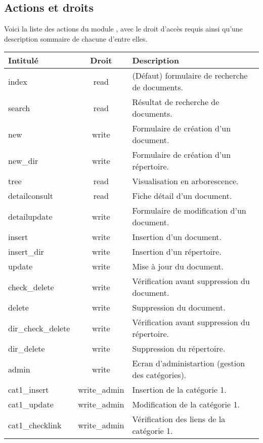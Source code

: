 \subsection{Actions et droits}

Voici la liste des actions du module \project, avec le droit d'accès requis ainsi qu'une description sommaire de chacune d'entre elles.\\

\begin{tabular}{|l|c|p{9.5cm}|}
 \hline
 \textbf{Intitulé} & \textbf{Droit} & \textbf{Description} \\
 \hline
 \hline
  index & read & (Défaut) formulaire de recherche de documents. \\ 
 \hline
  search & read & Résultat de recherche de documents. \\
 \hline
  new & write & Formulaire de création d'un document. \\
 \hline
  new\_dir & write & Formulaire de création d'un répertoire. \\
 \hline
  tree & read & Visualisation en arborescence. \\
 \hline
  detailconsult & read & Fiche détail d'un document. \\
 \hline
  detailupdate & write & Formulaire de modification d'un document. \\
 \hline
  insert & write & Insertion d'un document. \\
 \hline
  insert\_dir & write & Insertion d'un répertoire. \\
 \hline
  update & write & Mise à jour du document. \\
 \hline
  check\_delete & write & Vérification avant suppression du document. \\
 \hline
  delete & write & Suppression du document. \\
 \hline
  dir\_check\_delete & write & Vérification avant suppression du répertoire. \\
 \hline
  dir\_delete & write & Suppression du répertoire. \\
 \hline
  admin & write & Ecran d'administartion (gestion des catégories). \\
 \hline
  cat1\_insert & write\_admin & Insertion de la catégorie 1. \\
 \hline
  cat1\_update & write\_admin & Modification de la catégorie 1. \\
 \hline
  cat1\_checklink & write\_admin & Vérification des liens de la catégorie 1. \\

\end{tabular}
